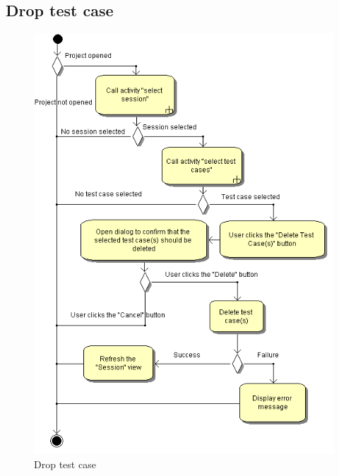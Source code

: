 \subsection{Drop test case}
\begin{figure}[htb]
 \centering
 \includegraphics[height=0.7\textheight]{images/Activities/drop_test_case.png}
 \caption{Drop test case}
 \label{ac_fg:drop_test_case}
\end{figure}

\clearpage
